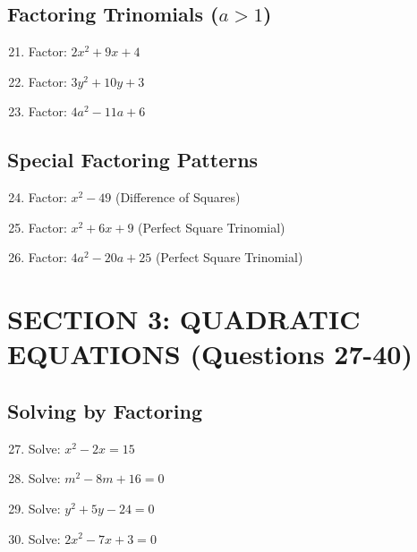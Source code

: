 \documentclass[12pt]{article}
\begin{document}
\subsection*{Factoring Trinomials ($a > 1$)}

\begin{enumerate}
\setcounter{enumi}{20}
\item Factor: $2x^2 + 9x + 4$

\item Factor: $3y^2 + 10y + 3$

\item Factor: $4a^2 - 11a + 6$
\end{enumerate}

\subsection*{Special Factoring Patterns}

\begin{enumerate}
\setcounter{enumi}{23}
\item Factor: $x^2 - 49$ (Difference of Squares)

\item Factor: $x^2 + 6x + 9$ (Perfect Square Trinomial)

\item Factor: $4a^2 - 20a + 25$ (Perfect Square Trinomial)
\end{enumerate}

\hrulefill

\section*{SECTION 3: QUADRATIC EQUATIONS (Questions 27-40)}

\subsection*{Solving by Factoring}

\begin{enumerate}
\setcounter{enumi}{26}
\item Solve: $x^2 - 2x = 15$

\item Solve: $m^2 - 8m + 16 = 0$

\item Solve: $y^2 + 5y - 24 = 0$

\item Solve: $2x^2 - 7x + 3 = 0$
\end{enumerate}
\end{document}
